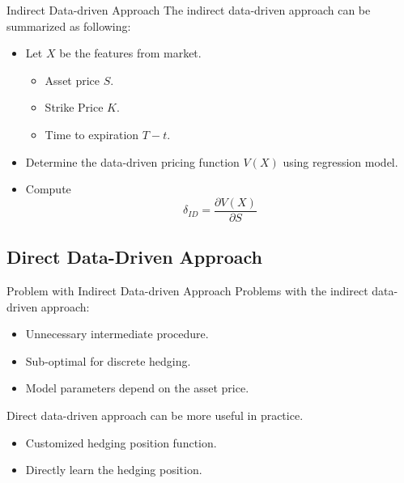 \documentclass[10pt,table,mathserif]{beamer}
\begin{document}
\begin{frame}{Indirect Data-driven Approach}
The indirect data-driven approach \footnotemark can be summarized as following:
\begin{itemize}
\item Let $X$ be the features from market.
\begin{itemize}
  \item Asset price $S$.
  \item Strike Price $K$.
  \item Time to expiration $T-t$.
\end{itemize}
\item Determine the data-driven pricing function $V(X)$ using regression model.
\item Compute
\[
\delta_{ID}=\frac{ \partial V(X) }{ \partial S}
\]
\end{itemize}
\end{frame}

\subsection{Direct Data-Driven Approach}
\begin{frame}{Problem with Indirect Data-driven Approach}
Problems with the indirect data-driven approach:
\begin{itemize}
  \item Unnecessary intermediate procedure.
  \item Sub-optimal for discrete hedging.
  \item Model parameters depend on the asset price.
\end{itemize}

Direct data-driven approach can be more useful in practice.
\begin{itemize}
  \item Customized hedging position function.
  \item Directly learn the hedging position.
\end{itemize}
\end{frame}
\end{document}
